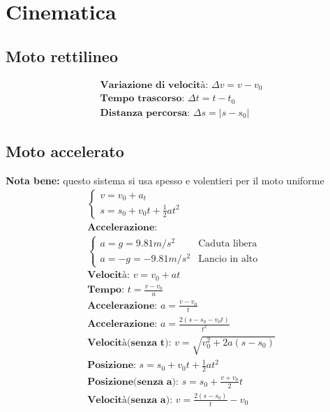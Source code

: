 \section{Cinematica}
\subsection{Moto rettilineo}
\begin{gather*}
\textbf{Variazione di velocità: } \Delta v = v - v_0 \\
\textbf{Tempo trascorso: } \Delta t = t - t_0 \\
\textbf{Distanza percorsa: } \Delta s = \left| s - s_0 \right|
\end{gather*}
\subsection{Moto accelerato}
\textbf{Nota bene: } questo sistema si usa spesso e volentieri per il moto uniforme
\begin{gather*}
\begin{cases}
    v = v_0 + a_t \\
    s = s_0 + v_0 t + \frac{1}{2} a t^2
\end{cases}
\\
\textbf{Accelerazione:} \\
\begin{cases}
 a = g = 9.81 m/s^2 & \text{Caduta libera} \\
 a = -g = - 9.81m/s^2 & \text{Lancio in alto}
\end{cases}
\\
\textbf{Velocità: } v = v_0 + a t \\
\textbf{Tempo: } t = \frac{v - v_0}{a} \\
\textbf{Accelerazione: } a = \frac{v - v_0}{t} \\
\textbf{Accelerazione: } a = \frac{2 (s - s_0 - v_0 t)}{t^2} \\
\textbf{Velocità(senza t): } v = \sqrt{v_0^2 + 2 a (s - s_0)} \\
\textbf{Posizione: } s = s_0 + v_0 t + \frac{1}{2} a t^2 \\
\textbf{Posizione(senza a): } s = s_0 + \frac{v + v_0}{2} t \\
\textbf{Velocità(senza a): } v = \frac{2 (s - s_0)}{t} - v_0
\end{gather*}
